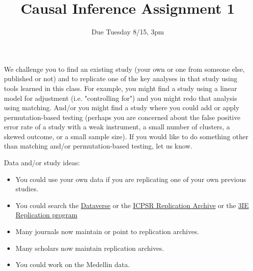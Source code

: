 \documentclass{article}
\title{Causal Inference Assignment 1}
\author{Due Tuesday 8/15, 3pm}
\begin{document}
\maketitle

We challenge you to find an existing study (your own or one from someone else, published or not) and to replicate one of the key analyses in that study using tools learned in this class. For example, you might find a study using a linear model for adjustment (i.e. "controlling for") and you might redo that analysis using matching. And/or you might find a study where you could add or apply permutation-based testing (perhaps you are concerned about the false positive error rate of a study with a weak instrument, a small number of clusters, a skewed outcome, or a small sample size). If you would like to do something other than matching and/or permutation-based testing, let us know.

Data and/or study ideas:
\begin{itemize}
 \item You could use your own data if you are replicating one of your own previous studies.
 \item You could search the \href{http://dataverse.org/}{Dataverse} or the \href{http://www.icpsr.umich.edu/icpsrweb/deposit/pra/index.jsp}{ICPSR Replication Archive} or the \href{http://www.3ieimpact.org/evaluation/impact-evaluation-replication-programme/}{3IE Replication program}
 \item Many journals now maintain or point to replication archives.
 \item Many scholars now maintain replication archives.
 \item You could work on the Medellin data.
\end{itemize}
\end{document}
